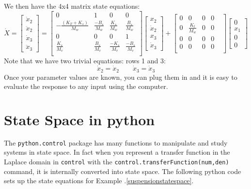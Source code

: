 \begin{Example}
We then have the 4x4 matrix state equations:
\[
\dot{X} = \begin{bmatrix}\dot{x}_2 \\ \ddot{x}_2 \\ \dot{x}_3 \\ \ddot{x}_3\end{bmatrix}
=
\begin{bmatrix} 0&1&0&0\\
-\frac{(K_T+K_s)}{M_w}&\frac{-B_s}{M_w}&\frac{K_s}{M_w}&\frac{B_s}{M_w}\\
0&0&0&1 \\
\frac{K_s}{M_v}&\frac{B_s}{M_v}&\frac{-K_s}{M_v}&\frac{-B_s}{M_v}\\
\end{bmatrix}
\begin{bmatrix}x_2\\\dot{x}_2\\x_3\\\dot{x}_3 \end{bmatrix}+
\begin{bmatrix}
    0&0&0&0&\\
    0&\frac{K_t}{M_w}&0&0&\\
    0&0&0&0&\\
    0&0&0&0&\\
\end{bmatrix}
\begin{bmatrix} 0 \\x_1\\0\\ 0\end{bmatrix}
\]
Note that we have two trivial equations: rows 1 and 3:
\[
\dot{x}_2 = \dot{x}_2 \qquad \dot{x}_3 = \dot{x}_3
\]
Once your parameter values are known, you can plug them in and it is easy to evaluate the response to any input using the computer.
\end{Example}

\section{State Space in python}
The {\tt python.control} package has many functions to manipulate and study systems in state space.  In fact when you represent a transfer function in the Laplace domain in {\tt control} with the {\tt control.transferFunction(num,den)} command, it is internally converted into state space.   The following python code sets up the state equations for
Example \thechapter.\ref{suspensionstatespace}.

